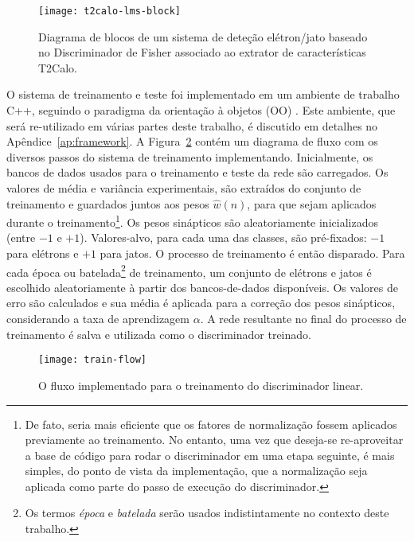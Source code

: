 \begin{figure}
\begin{center}
\texttt{[image: t2calo-lms-block]}
\end{center}
\caption{Diagrama de blocos de um sistema de deteção elétron/jato baseado no
Discriminador de Fisher associado ao extrator de características T2Calo.}
\label{fig:t2calo-lms-block}
\end{figure}

O sistema de treinamento e teste foi implementado em um ambiente de trabalho
C++, seguindo o paradigma da orientação à objetos (OO) \cite{stroustrup,
booch}. Este ambiente, que será re-utilizado em várias partes deste trabalho,
é discutido em detalhes no Apêndice~\ref{ap:framework}. A
Figura~\ref{fig:train-flow} contém um diagrama de fluxo com os diversos passos
do sistema de treinamento implementando. Inicialmente, os bancos de dados
usados para o treinamento e teste da rede são carregados. Os valores de média
e variância experimentais, são extraídos do conjunto de treinamento e
guardados juntos aos pesos $\hat{w}(n)$, para que sejam aplicados durante o
treinamento\footnote{De fato, seria mais eficiente que os fatores de
normalização fossem aplicados previamente ao treinamento. No entanto, uma vez
que deseja-se re-aproveitar a base de código para rodar o discriminador em uma
etapa seguinte, é mais simples, do ponto de vista da implementação, que a
normalização seja aplicada como parte do passo de execução do
discriminador.}. Os pesos sinápticos são aleatoriamente inicializados (entre
$-1$ e $+1$). Valores-alvo, para cada uma das classes, são pré-fixados: $-1$
para elétrons e $+1$ para jatos. O processo de treinamento é então
disparado. Para cada época ou batelada\footnote{Os termos \textit{época} e
\textit{batelada} serão usados indistintamente no contexto deste trabalho.}
de treinamento, um conjunto de elétrons e jatos é escolhido aleatoriamente à
partir dos bancos-de-dados disponíveis. Os valores de erro são calculados e
sua média é aplicada para a correção dos pesos sinápticos, considerando a taxa
de aprendizagem $\alpha$. A rede resultante no final do processo de
treinamento é salva e utilizada como o discriminador treinado.

\begin{figure}
\begin{center}
\texttt{[image: train-flow]}
\end{center}
\caption{O fluxo implementado para o treinamento do discriminador linear.}
\label{fig:train-flow}
\end{figure}

